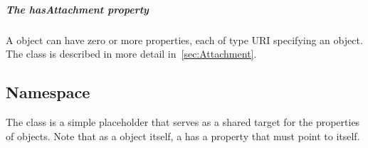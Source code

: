 \subparagraph{The hasAttachment property}
\label{sec:hasAttachment}
A  object can have zero or more  properties, each of type URI specifying an  object. The  class is described in more detail in~\ref{sec:Attachment}.


\subsection{Namespace}
\label{sec:Namespace}

The  class is a simple placeholder that serves as a shared target for the  properties of  objects.
Note that as a  object itself, a  has a  property that must point to itself.

